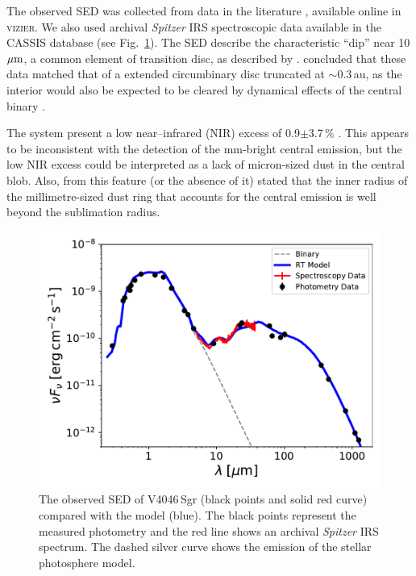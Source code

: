 \documentclass[fleqn,usenatbib,useAMS]{mnras}
\begin{document}
The observed SED was collected from data in the literature \citep{1988iras....7.....H, 1990A&A...234..230H, Jensen_97, 2000A&A...355L..27H, 2001KFNT...17..409K, 2003yCat.2246....0C, 2007PASJ...59S.369M, 2008PASP..120.1128O, 2010A&A...514A...1I, 2012yCat.2311....0C}, available online in \textsc{vizier}. We also used archival \textit{Spitzer} IRS spectroscopic data available in the CASSIS database \citep{Lebouteiller_2015} (see Fig.~\ref{fig:SED}). The SED describe the characteristic “dip” near 10 $\hbox{$\mu$m}$, a common element of transition disc, as described by \citet{Rosenfeld_2013}. \citet{Jensen_97} concluded that these data matched that of a extended circumbinary disc truncated at $\sim$0.3\,au, as the interior would also be expected to be cleared by dynamical effects of the central binary \citep{Art_Lu}. 

The system present a low near--infrared (NIR) excess of 0.9$\pm$3.7\,\% \citep{Francis_2020}. This appears to be inconsistent with the detection of the mm-bright central emission, but the low NIR excess could be interpreted as a lack of micron-sized dust in the central blob. Also, from this feature (or the absence of it) \citet{Francis_2020} stated that the inner radius of the millimetre-sized dust ring that accounts for the central emission is well beyond the sublimation radius.

\begin{figure}
	\centering
	\includegraphics[width=\columnwidth]{SED_.pdf}
    \caption{The observed SED of V4046\,Sgr (black points and solid red curve) compared with the model (blue). The black points represent the measured photometry and the red line shows an archival \textit{Spitzer} IRS spectrum. The dashed silver curve shows the emission of the stellar photosphere model.}
    \label{fig:SED}
\end{figure}
\end{document}
